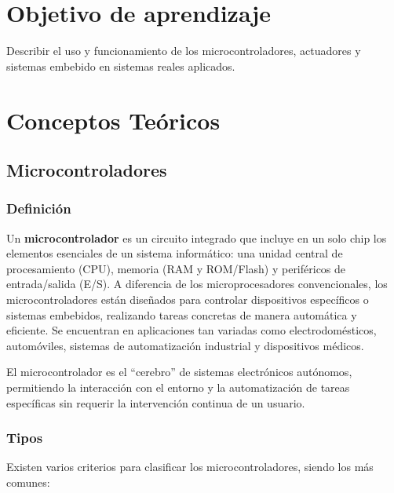 \documentclass[a4paper,12pt]{article}
\begin{document}
	
	\tableofcontents
	
	\newpage
	\section{Objetivo de aprendizaje}
	Describir el uso y funcionamiento de los microcontroladores, actuadores y sistemas embebido en sistemas reales aplicados.
	
	\section{Conceptos Teóricos}
	
	\subsection{Microcontroladores}
	\subsubsection{Definición}
	Un \textbf{microcontrolador} es un circuito integrado que incluye en un solo chip los elementos esenciales de un sistema informático: una unidad central de procesamiento (CPU), memoria (RAM y ROM/Flash) y periféricos de entrada/salida (E/S). A diferencia de los microprocesadores convencionales, los microcontroladores están diseñados para controlar dispositivos específicos o sistemas embebidos, realizando tareas concretas de manera automática y eficiente. Se encuentran en aplicaciones tan variadas como electrodomésticos, automóviles, sistemas de automatización industrial y dispositivos médicos.
	
	El microcontrolador es el “cerebro” de sistemas electrónicos autónomos, permitiendo la interacción con el entorno y la automatización de tareas específicas sin requerir la intervención continua de un usuario.
	
	\subsubsection{Tipos}
	Existen varios criterios para clasificar los microcontroladores, siendo los más comunes:
	
\end{document}
